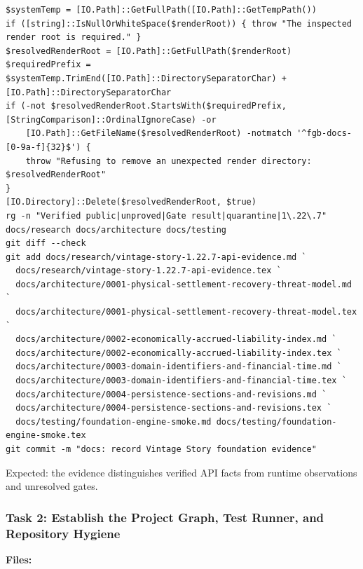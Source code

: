 \documentclass[
  10pt,
  letterpaper,
]{article}
\begin{document}
\begin{lstlisting}
$systemTemp = [IO.Path]::GetFullPath([IO.Path]::GetTempPath())
if ([string]::IsNullOrWhiteSpace($renderRoot)) { throw "The inspected render root is required." }
$resolvedRenderRoot = [IO.Path]::GetFullPath($renderRoot)
$requiredPrefix = $systemTemp.TrimEnd([IO.Path]::DirectorySeparatorChar) + [IO.Path]::DirectorySeparatorChar
if (-not $resolvedRenderRoot.StartsWith($requiredPrefix, [StringComparison]::OrdinalIgnoreCase) -or
    [IO.Path]::GetFileName($resolvedRenderRoot) -notmatch '^fgb-docs-[0-9a-f]{32}$') {
    throw "Refusing to remove an unexpected render directory: $resolvedRenderRoot"
}
[IO.Directory]::Delete($resolvedRenderRoot, $true)
rg -n "Verified public|unproved|Gate result|quarantine|1\.22\.7" docs/research docs/architecture docs/testing
git diff --check
git add docs/research/vintage-story-1.22.7-api-evidence.md `
  docs/research/vintage-story-1.22.7-api-evidence.tex `
  docs/architecture/0001-physical-settlement-recovery-threat-model.md `
  docs/architecture/0001-physical-settlement-recovery-threat-model.tex `
  docs/architecture/0002-economically-accrued-liability-index.md `
  docs/architecture/0002-economically-accrued-liability-index.tex `
  docs/architecture/0003-domain-identifiers-and-financial-time.md `
  docs/architecture/0003-domain-identifiers-and-financial-time.tex `
  docs/architecture/0004-persistence-sections-and-revisions.md `
  docs/architecture/0004-persistence-sections-and-revisions.tex `
  docs/testing/foundation-engine-smoke.md docs/testing/foundation-engine-smoke.tex
git commit -m "docs: record Vintage Story foundation evidence"
\end{lstlisting}

Expected: the evidence distinguishes verified API facts from runtime
observations and unresolved gates.

\subsubsection{Task 2: Establish the Project Graph, Test Runner, and
Repository
Hygiene}\label{task-2-establish-the-project-graph-test-runner-and-repository-hygiene}

\textbf{Files:}
\end{document}
